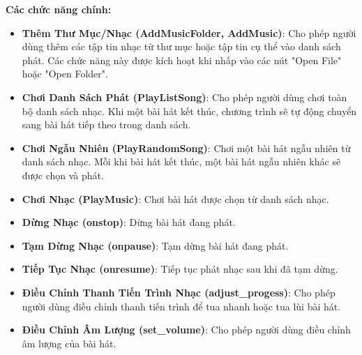 \documentclass[a4paper]{article}
\begin{document}
\textbf{Các chức năng chính:}
\begin{itemize}
    \item \textbf{Thêm Thư Mục/Nhạc (AddMusicFolder, AddMusic)}: Cho phép người dùng thêm các tập tin nhạc từ thư mục hoặc tập tin cụ thể vào danh sách phát. Các chức năng này được kích hoạt khi nhấp vào các nút "Open File" hoặc "Open Folder".
    \item \textbf{Chơi Danh Sách Phát (PlayListSong)}: Cho phép người dùng chơi toàn bộ danh sách nhạc. Khi một bài hát kết thúc, chương trình sẽ tự động chuyển sang bài hát tiếp theo trong danh sách.
    \item \textbf{Chơi Ngẫu Nhiên (PlayRandomSong)}: Chơi một bài hát ngẫu nhiên từ danh sách nhạc. Mỗi khi bài hát kết thúc, một bài hát ngẫu nhiên khác sẽ được chọn và phát.
    \item \textbf{Chơi Nhạc (PlayMusic)}: Chơi bài hát được chọn từ danh sách nhạc.
    \item \textbf{Dừng Nhạc (onstop)}: Dừng bài hát đang phát.
    \item \textbf{Tạm Dừng Nhạc (onpause)}: Tạm dừng bài hát đang phát.
    \item \textbf{Tiếp Tục Nhạc (onresume)}: Tiếp tục phát nhạc sau khi đã tạm dừng.
    \item \textbf{Điều Chỉnh Thanh Tiến Trình Nhạc (adjust\_progess)}: Cho phép người dùng điều chỉnh thanh tiến trình để tua nhanh hoặc tua lùi bài hát.
    \item \textbf{Điều Chỉnh Âm Lượng (set\_volume)}: Cho phép người dùng điều chỉnh âm lượng của bài hát.
\end{itemize}
\end{document}

